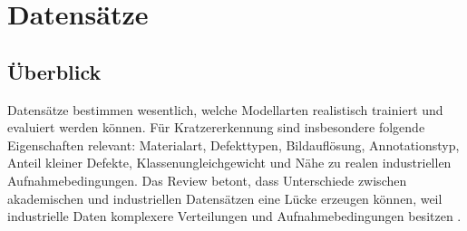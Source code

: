 \documentclass[11pt,a4paper]{article}
\begin{document}
\section{Datensätze}

\subsection{Überblick}

Datensätze bestimmen wesentlich, welche Modellarten realistisch trainiert und evaluiert werden können. Für Kratzererkennung sind insbesondere folgende Eigenschaften relevant: Materialart, Defekttypen, Bildauflösung, Annotationstyp, Anteil kleiner Defekte, Klassenungleichgewicht und Nähe zu realen industriellen Aufnahmebedingungen. Das Review betont, dass Unterschiede zwischen akademischen und industriellen Datensätzen eine Lücke erzeugen können, weil industrielle Daten komplexere Verteilungen und Aufnahmebedingungen besitzen \cite{applications_review}.
\end{document}
